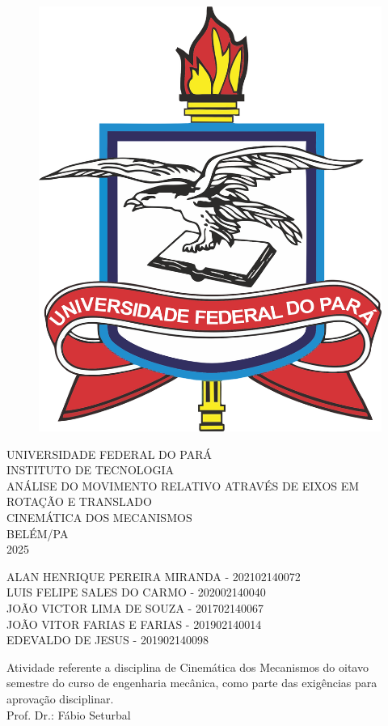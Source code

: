 \thispagestyle{empty}

\begin{center}
	\begin{figure}[h]
  \centering
		\includegraphics[width=0.21\linewidth]{images/ufpa}
		\label{fig:ufpa}
	\end{figure}


	\vspace{1cm}
	\large \uppercase{UNIVERSIDADE FEDERAL DO PARÁ}\\
	\large \uppercase{INSTITUTO DE TECNOLOGIA}\\
	\vspace{7cm}
	\large \uppercase{ANÁLISE DO MOVIMENTO RELATIVO ATRAVÉS DE EIXOS EM ROTAÇÃO E TRANSLADO}\\
	\vspace{1cm}
	\large \uppercase {CINEMÁTICA DOS MECANISMOS} \\
	\vspace{7cm}
	\large {BELÉM/PA \\ 2025}

 \newpage
 \thispagestyle{empty}
 	\large\uppercase{alan henrique pereira miranda - 202102140072}\\
	\large\uppercase{Luis Felipe Sales do Carmo - 202002140040}\\
	\large\uppercase{João Victor Lima de Souza - 201702140067}\\
	\large\uppercase{João Vitor Farias e Farias  - 201902140014}\\
	\large\uppercase{Edevaldo de Jesus - 201902140098}\\
 \vspace{1cm}

 \singlespacing
 \hspace{8cm} %
 \begin{minipage}{7cm}
	Atividade referente a disciplina de Cinemática dos Mecanismos do oitavo semestre do curso de engenharia mecânica, como parte das exigências para aprovação disciplinar. \\

	Prof. Dr.: Fábio Seturbal\\
	\vspace{1cm}


\end{minipage}
\end{center}
